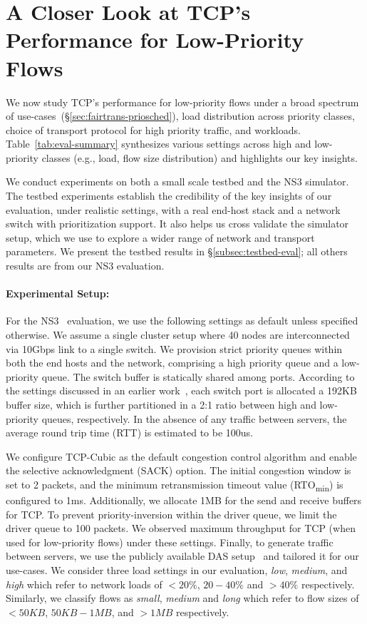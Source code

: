 \section{A Closer Look at TCP's Performance for Low-Priority Flows}
\label{sec:eval-main}

We now study TCP's performance for low-priority flows under a broad spectrum of use-cases~(\S\ref{sec:fairtrans-priosched}), load distribution across priority classes, choice of transport protocol for high priority traffic, and workloads.
Table~\ref{tab:eval-summary} synthesizes various settings across high and low-priority classes (e.g., load, flow size distribution) and highlights our key insights. 

We conduct experiments on both a small scale testbed and the NS3 simulator. The testbed experiments establish the credibility of the key insights of our evaluation, under realistic settings, with a real end-host stack and a network switch with prioritization support. It also helps us cross validate the simulator setup, which we use to explore a wider range of network and transport parameters. We present the testbed results in \S\ref{subsec:testbed-eval}; all others results are from our NS3 evaluation. 




\paragraph{\textbf{Experimental Setup:}}
For the NS3~\cite{ns3} evaluation, we use the following settings as default unless specified otherwise. We assume a single cluster setup where 40 nodes are interconnected via 10Gbps link to a single switch. We provision strict priority queues within both the end hosts and the network, comprising a high priority queue and a low-priority queue. 
The switch buffer is statically shared among ports. According to the settings discussed in an earlier work~\cite{one-more-config}, each switch port is allocated a 192KB buffer size, which is further partitioned in a 2:1 ratio between high and low-priority queues, respectively. In the absence of any traffic between servers, the average round trip time (RTT) is estimated to be 100us. 

We configure TCP-Cubic as the default congestion control algorithm and enable the selective acknowledgment (SACK) option. The initial congestion window is set to 2 packets, and the minimum retransmission timeout value (RTO\textsubscript{min}) is configured to 1ms. Additionally, we allocate 1MB for the send and receive buffers for TCP. To prevent priority-inversion within the driver queue, we limit the driver queue to 100 packets. We observed maximum throughput for TCP (when used for low-priority flows) under these settings. 
Finally, to generate traffic between servers, we use the publicly available DAS setup~\cite{das-setup} and tailored it for our use-cases.
We consider three load settings in our evaluation, \emph{low}, \emph{medium}, and \emph{high} which refer to network loads of $<20\%$, $20-40\%$ and $>40\%$ respectively. Similarly, we classify flows as \emph{small}, \emph{medium} and \emph{long} which refer to flow sizes of $<50KB$, $50KB-1MB$, and $>1MB$ respectively. 

